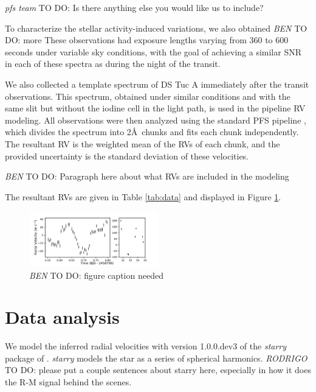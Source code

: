 \documentclass[twocolumn]{aastex62}
\newcommand{\todo}[3]{{\color{#2} \emph{#1} TO DO: #3}}
\newcommand{\btmtodo}[1]{\todo{BEN}{blue}{#1}}
\begin{document}
\todo{pfs team}{red}{Is there anything else you would like us to include?}

To characterize the stellar activity-induced variations, we also obtained \btmtodo{more}
These observations had exposure lengths varying from 360 to 600 seconds under variable sky conditions, with the goal of achieving a similar SNR in each of these spectra as during the night of the transit.

We also collected a template spectrum of DS Tuc A immediately after the transit observations. 
This spectrum, obtained under similar conditions and with the same slit but without the iodine cell in the light path, is used in the pipeline RV modeling.
All observations were then analyzed using the standard PFS pipeline \citep{Butler96}, which divides the spectrum into 2\AA\ chunks and fits each chunk independently.
The resultant RV is the weighted mean of the RVs of each chunk, and the provided uncertainty is the standard deviation of these velocities.

\btmtodo{Paragraph here about what RVs are included in the modeling}

The resultant RVs are given in Table \ref{tab:data} and displayed in Figure \ref{fig:data}.




\begin{figure}[!tbh]
  \begin{center}
    \includegraphics[width=0.5\textwidth, trim={0cm 0.0cm 0cm 0cm}, clip=true]{../figures/all_data.pdf}
   \end{center}
  \caption{\btmtodo{figure caption needed}}
  \label{fig:data}
\end{figure}



\section{Data analysis}
\label{sec:analysis}

We model the inferred radial velocities with version 1.0.0.dev3 of the \textit{starry} package of \citet{Luger19}. 
\textit{starry} models the star as a series of spherical harmonics. 
\todo{RODRIGO}{red}{please put a couple sentences about starry here, especially in how it does the R-M signal behind the scenes.}
\end{document}
